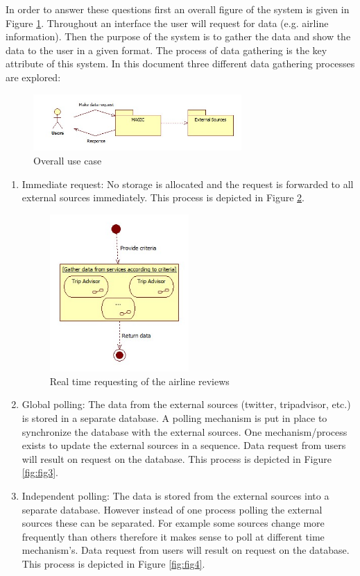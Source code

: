 \documentclass{article}
\begin{document}
In order to answer these questions first an overall figure of the system is given in Figure \ref{fig:fig1}. 
Throughout an interface the user will request for data (e.g. airline information). Then the purpose of the system is to gather
the data and show the data to the user in a given format. The process of data gathering is the key attribute of this system.
In this document three different data gathering processes are explored:

\begin{figure}[!]
\centering
\includegraphics[width=300px]{UserRequestingData}
\caption{Overall use case}
\label{fig:fig1}
\end{figure}

\begin{enumerate}
\item Immediate request: No storage is allocated and the request is forwarded to all external sources immediately. This process is depicted in Figure \ref{fig:fig2}.  

\begin{figure}[!htbp]
\centering
\includegraphics[width=200px]{Realtime}
\caption{Real time requesting of the airline reviews}
\label{fig:fig2}
\end{figure}

\item Global polling: The data from the external sources (twitter, tripadvisor, etc.) is stored in a separate database. A polling mechanism is put in place to synchronize the database with the external sources. One mechanism/process exists to update the external sources in a sequence. Data request from users will result on request on the database. This process is depicted in Figure \ref{fig:fig3}.  
\item Independent polling: The data is stored from the external sources into a
separate database. However instead of one process polling the external sources
these can be separated. For example some sources change more frequently than
others therefore it makes sense to poll at different time mechanism's. Data
request from users will result on request on the database. This process is
depicted in Figure \ref{fig:fig4}.  
\end{enumerate}
\end{document}
